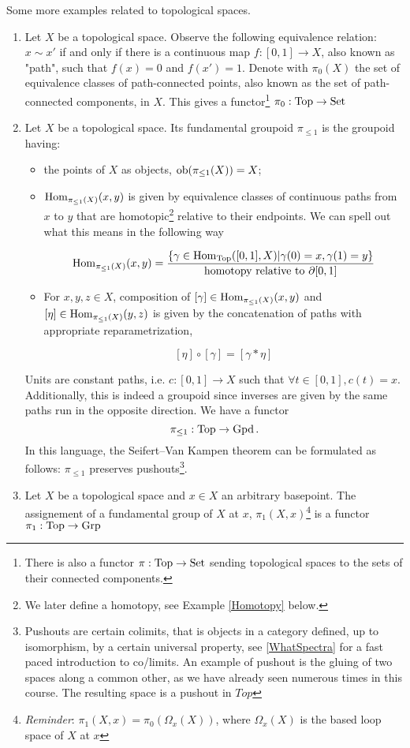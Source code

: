 \begin{ex}\extra
Some more examples related to topological spaces.
    \begin{enumerate}
    \item \label{PathConnFunct} Let $X$ be a topological space. Observe the following equivalence relation: $x\sim x'$ if and only if there is a continuous map $f:[0,1]\to X$, also known as "path", such that $f(x)=0$ and $f(x')=1$. Denote with $\pi_0(X)$ the set of equivalence classes of path-connected points, also known as the set of path-connected components, in $X$. This gives a functor\footnote{There is also a functor $\pi:\operatorname{Top}\to \operatorname{Set}$ sending topological spaces to the sets of their connected components.} $\pi_0:\operatorname{Top}\to \operatorname{Set}$
    \item Let $X$ be a topological space. Its fundamental groupoid $\pi_{\leq 1}$ is the groupoid having:
    \begin{itemize}
        \item the points of $X$ as objects, $\operatorname{ob}(\pi_{\leq 1}(X))=X$;
        \item $\operatorname{Hom}_{\pi_{\leq 1}(X)}(x,y)$ is given by equivalence classes of continuous paths from $x$ to $y$ that are homotopic\footnote{We later define a homotopy, see Example \ref{Homotopy} below.} relative to their endpoints. We can spell out what this means in the following way
    
        $$\operatorname{Hom}_{\pi_{\leq 1}(X)}(x,y)= \frac{\{\gamma\in \operatorname{Hom}_{\operatorname{Top}}([0,1],X)|\gamma(0)=x,\gamma(1)=y\}}{\text{homotopy relative to }\partial[0,1]}$$

        \item For $x,y,z\in X$, composition of $[\gamma]\in \operatorname{Hom}_{\pi_{\leq 1}(X)}(x,y)$ and $[\eta]\in \operatorname{Hom}_{\pi_{\leq 1}(X)}(y,z)$ is given by the concatenation of paths with appropriate reparametrization, 
    
        $$[\eta]\circ[\gamma]=[\gamma\ast\eta]$$
    
    \end{itemize} 
    Units are constant paths, i.e. $c:[0,1]\to X$ such that $\forall t\in[0,1], c(t)=x$. Additionally, this is indeed a groupoid since inverses are given by the same paths run in the opposite direction. We have a functor 
    $$\pi_{\leq 1}:\operatorname{Top}\to \operatorname{Gpd}.$$
    In this language, the Seifert–Van Kampen theorem can be formulated as follows: $\pi_{\leq1}$
     preserves pushouts\footnote{Pushouts are certain colimits, that is objects in a category
         defined, up to
         isomorphism, by a certain universal property, see \ref{WhatSpectra} for a fast paced 
         introduction to co/limits. An example of pushout is the gluing of two
          spaces along a common other, as we have already seen numerous times in this course. 
          The resulting space is a pushout in $Top$}.
    
    \item Let $X$ be a topological space and $x\in X$ an arbitrary basepoint. The assignement of a fundamental group of $X$ at $x$, $\pi_1(X,x)$\footnote{\textit{Reminder}: $\pi_1(X,x)=\pi_0(\Omega_x(X))$, where $\Omega_x(X)$ is the based loop space of $X$ at $x$} is a functor $\pi_1:\operatorname{Top}\to \operatorname{Grp}$
    \end{enumerate}
\end{ex}

